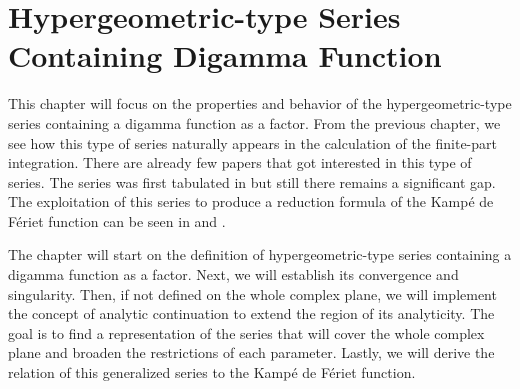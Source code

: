 \chapter{Hypergeometric-type Series Containing Digamma Function}
\label{ch_4}

This chapter will focus on the properties and behavior of the hypergeometric-type series containing a digamma function as a factor. From the previous chapter, we see how this type of series naturally appears in the calculation of the finite-part integration. There are already few papers that got interested in this type of series. The series was first tabulated in \cite{hansen1975table} but still there remains a significant gap. The exploitation of this series to produce a reduction formula of the Kampé de Fériet function can be seen in \cite{miller2006summations} and \cite{cvijovic2008closed}.

The chapter will start on the definition of hypergeometric-type series containing a digamma function as a factor. Next, we will establish its convergence and singularity. Then, if not defined on the whole complex plane, we will implement the concept of analytic continuation to extend the region of its analyticity. The goal is to find a representation of the series that will cover the whole complex plane and broaden the restrictions of each parameter. Lastly, we will derive the relation of this generalized series to the Kampé de Fériet function.

